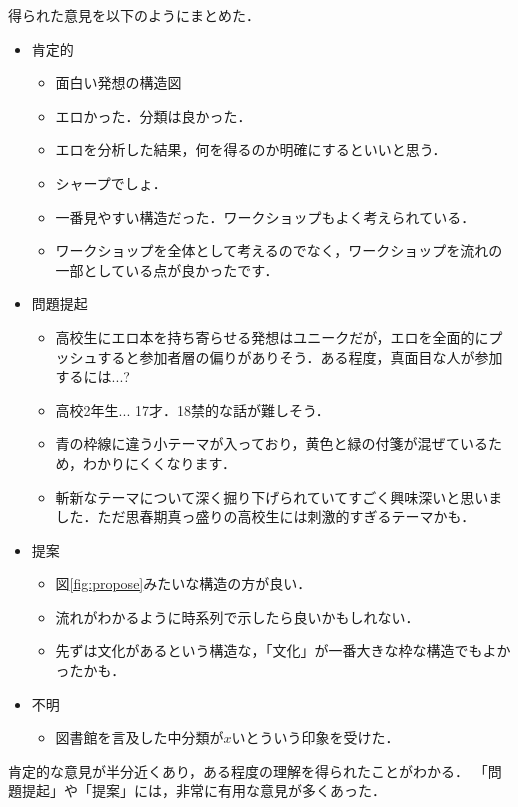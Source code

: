 \documentclass[uplatex,a4paper]{jsarticle}
\begin{document}
得られた意見を以下のようにまとめた．
\begin{itemize}
    \item 肯定的
    \begin{itemize}
        \item 面白い発想の構造図
        \item エロかった．分類は良かった．
        \item エロを分析した結果，何を得るのか明確にするといいと思う．
        \item シャープでしょ．
        \item 一番見やすい構造だった．ワークショップもよく考えられている．
        \item ワークショップを全体として考えるのでなく，ワークショップを流れの一部としている点が良かったです．
    \end{itemize}
    \item 問題提起
    \begin{itemize}
        \item 高校生にエロ本を持ち寄らせる発想はユニークだが，エロを全面的にプッシュすると参加者層の偏りがありそう．ある程度，真面目な人が参加するには...?
        \item 高校2年生... 17才．18禁的な話が難しそう．
        \item 青の枠線に違う小テーマが入っており，黄色と緑の付箋が混ぜているため，わかりにくくなります．
        \item 斬新なテーマについて深く掘り下げられていてすごく興味深いと思いました．ただ思春期真っ盛りの高校生には刺激的すぎるテーマかも．
    \end{itemize}
    \item 提案
    \begin{itemize}
        \item 図\ref{fig:propose}みたいな構造の方が良い．
        \item 流れがわかるように時系列で示したら良いかもしれない．
        \item 先ずは文化があるという構造な，「文化」が一番大きな枠な構造でもよかったかも．
    \end{itemize}
    \item 不明
    \begin{itemize}
        \item 図書館を言及した中分類が$x$いとういう印象を受けた．
    \end{itemize}
\end{itemize}

肯定的な意見が半分近くあり，ある程度の理解を得られたことがわかる．
「問題提起」や「提案」には，非常に有用な意見が多くあった．
\end{document}
